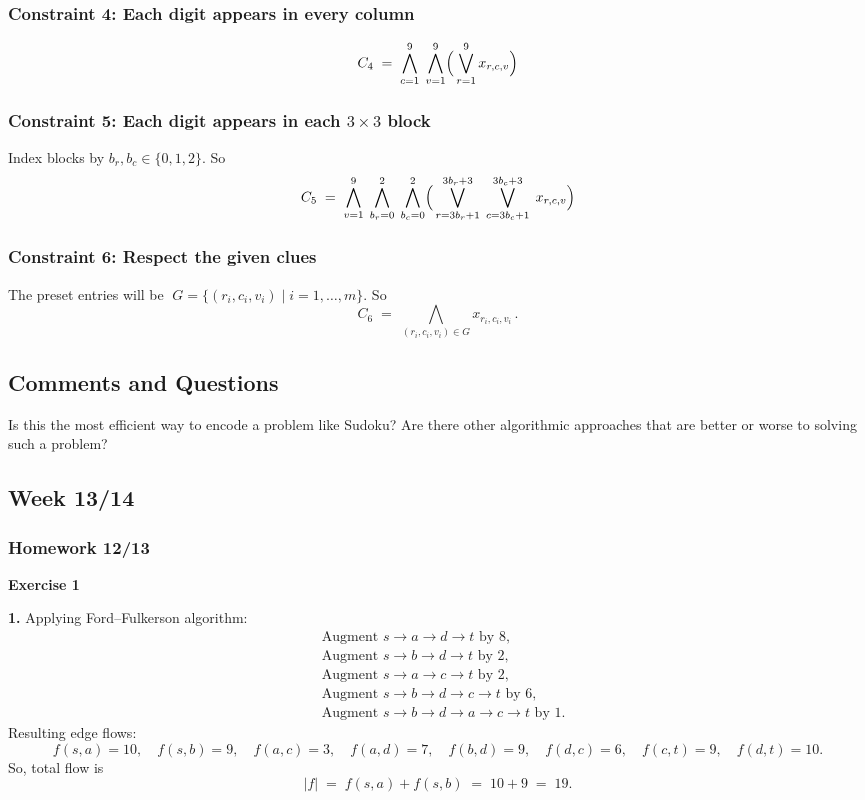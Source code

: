 \documentclass{article}
\theoremstyle{theorem}
\theoremstyle{definition}
\theoremstyle{remark}
\begin{document}
\subsubsection*{Constraint 4: Each digit appears in every column}
\[
C_{4}\;=\;
\bigwedge_{c=1}^{9}\;\bigwedge_{v=1}^{9}
\Bigl(\,\bigvee_{r=1}^{9} x_{r,c,v}\Bigr)
\]

\subsubsection*{Constraint 5: Each digit appears in each \(3\times3\) block}
Index blocks by \(b_r,b_c\in\{0,1,2\}\).  So
\[
C_{5}\;=\;
\bigwedge_{v=1}^{9}\;\bigwedge_{b_r=0}^{2}\;\bigwedge_{b_c=0}^{2}
\Bigl(\,\bigvee_{r=3b_r+1}^{3b_r+3}\;\bigvee_{c=3b_c+1}^{3b_c+3}\;
x_{r,c,v}\Bigr)
\]

\subsubsection*{Constraint 6: Respect the given clues}
The preset entries will be
\(\;G=\{(r_i,c_i,v_i)\mid i=1,\dots,m\}.\)
So
\[
C_{6}\;=\;
\bigwedge_{(r_i,c_i,v_i)\in G} x_{r_i,c_i,v_i}\,.
\]

\subsection*{Comments and Questions}

Is this the most efficient way to encode a problem like Sudoku? Are there other algorithmic approaches that are better or worse to solving such a problem?

\subsection{Week 13/14}

\subsubsection*{Homework 12/13}

\textbf{Exercise 1}

\textbf{1.} Applying Ford--Fulkerson algorithm:
\[
\begin{aligned}
&\text{Augment }s\to a\to d\to t\text{ by }8,\\
&\text{Augment }s\to b\to d\to t\text{ by }2,\\
&\text{Augment }s\to a\to c\to t\text{ by }2,\\
&\text{Augment }s\to b\to d\to c\to t\text{ by }6,\\
&\text{Augment }s\to b\to d\to a\to c\to t\text{ by }1.
\end{aligned}
\]
Resulting edge flows:
\[
f(s,a)=10,\quad f(s,b)=9,\quad f(a,c)=3,\quad f(a,d)=7,\quad f(b,d)=9,\quad f(d,c)=6,\quad f(c,t)=9,\quad f(d,t)=10.
\]
So, total flow is
\[
|f| \;=\; f(s,a)+f(s,b) \;=\; 10 + 9 \;=\; 19.
\]
\end{document}
